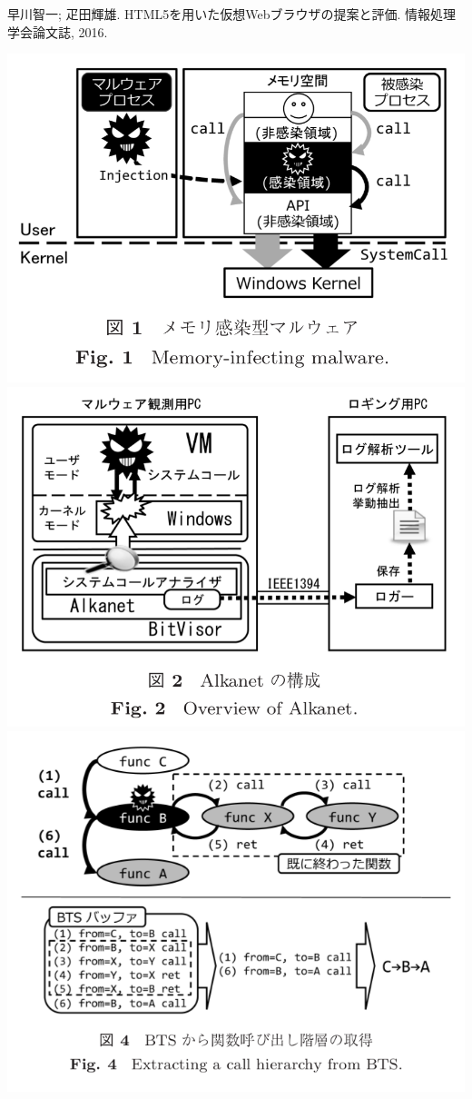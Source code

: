 \begin{frame}[plain,t]
  {早川智一; 疋田輝雄. HTML5を用いた仮想Webブラウザの提案と評価. 情報処理学会論文誌, 2016.}
  \begin{minipage}[t]{\linewidth}
      \includegraphics[height=0.15\textheight,keepaspectratio]{img/Target.png}
      \includegraphics[height=0.15\textheight,keepaspectratio]{img/SystemOverview.png}
      \includegraphics[height=0.15\textheight,keepaspectratio]{img/BTS.png}

\end{minipage}
\end{frame}
